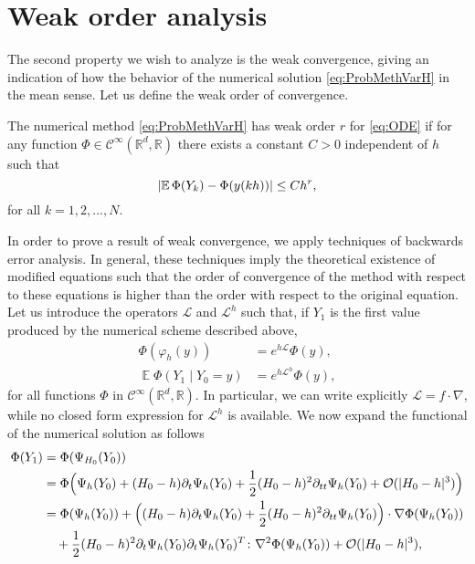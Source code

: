 \documentclass{siamart1116}
\numberwithin{theorem}{section}
\DeclarePairedDelimiter{\abs}{\lvert}{\rvert}
\renewcommand{\phi}{\varphi}
\newcommand{\R}{\mathbb{R}}
\newcommand{\OO}{\mathcal{O}}
\newcommand{\diffL}{\mathcal{L}}
\newcommand{\E}{\operatorname{\mathbb{E}}}
\begin{document}
\section{Weak order analysis}

The second property we wish to analyze is the weak convergence, giving an indication of how the behavior of the numerical solution \eqref{eq:ProbMethVarH} in the mean sense. Let us define the weak order of convergence. 
\begin{definition} The numerical method \eqref{eq:ProbMethVarH} has weak order $r$ for \eqref{eq:ODE} if for any function $\Phi\in \mathcal C^\infty(\R^d, \R)$ there exists a constant $C > 0$ independent of $h$ such that
	\begin{equation}
	\abs{\E\Phi(Y_k) - \Phi(y(kh))} \leq Ch^r,
	\end{equation}
	for all $k = 1, 2, \ldots, N$.
\end{definition} 
In order to prove a result of weak convergence, we apply techniques of backwards error analysis. In general, these techniques imply the theoretical existence of modified equations such that the order of convergence of the method with respect to these equations is higher than the order with respect to the original equation. Let us introduce the operators $\diffL$ and $\diffL^h$ such that, if $Y_1$ is the first value produced by the numerical scheme described above, 
\begin{equation}
\begin{aligned}
	\Phi(\phi_h(y)) &= e^{h\diffL}\Phi(y),\\
	\E \Phi(Y_1\mid Y_0 = y) &= e^{h\diffL^h}\Phi(y),
\end{aligned}
\end{equation}
for all functions $\Phi$ in $\mathcal{C}^{\infty}(\R^d, \R)$. In particular, we can write explicitly $\diffL = f\cdot \nabla$, while no closed form expression for $\diffL^h$ is available. We now expand the functional of the numerical solution as follows
\begin{equation}
\begin{aligned}
	\Phi(Y_1) &= \Phi(\Psi_{H_0}(Y_0)) \\
	&= \Phi\Big(\Psi_h(Y_0) + (H_0-h)\partial_t\Psi_h(Y_0) + \frac{1}{2}(H_0-h)^2\partial_{tt}\Psi_h(Y_0) + \OO(\abs{H_0 - h}^3)\Big)\\
	&= \Phi(\Psi_h(Y_0)) + \Big((H_0 - h)\partial_t\Psi_h(Y_0)+\frac{1}{2}(H_0-h)^2\partial_{tt}\Psi_h(Y_0)\Big) \cdot \nabla\Phi(\Psi_h(Y_0))\\
	&\quad + \frac{1}{2}(H_0 - h)^2 \partial_t \Psi_h(Y_0) \partial_t \Psi_h(Y_0)^T \colon \nabla^2\Phi(\Psi_h(Y_0)) + \OO(\abs{H_0 - h}^3),
\end{aligned}
\end{equation}
\end{document}
